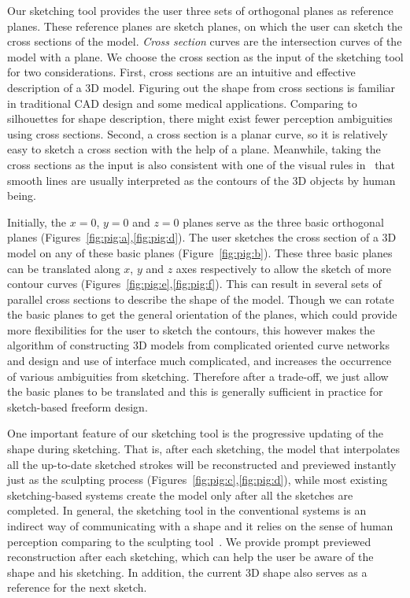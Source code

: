 Our sketching tool provides the user three sets of orthogonal planes
as reference planes. These reference planes are sketch planes, on
which the user can sketch the cross sections of the model.
\textit{Cross section} curves are the intersection curves of the
model with a plane. We choose the cross section as the input of the
sketching tool for two considerations. First, cross sections are an
intuitive and effective description of a 3D model. Figuring out the
shape from cross sections is familiar in traditional CAD design and
some medical applications. Comparing to silhouettes for shape
description, there might exist fewer perception ambiguities using
cross sections. Second, a cross section is a planar curve, so it is
relatively easy to sketch a cross section with the help of a plane.
Meanwhile, taking the cross sections as the input is also consistent
with one of the visual rules in~\cite{HD00} that smooth lines are
usually interpreted as the contours of the 3D objects by human being.

Initially, the $x=0$, $y=0$ and $z=0$ planes serve as the three
basic orthogonal planes (Figures~\ref{fig:pig:a},\ref{fig:pig:d}).
The user sketches the cross section of a 3D model on any of these
basic planes (Figure~\ref{fig:pig:b}). These three basic planes can
be translated along $x$, $y$ and $z$ axes respectively to allow the
sketch of more contour curves
(Figures~\ref{fig:pig:e},\ref{fig:pig:f}). This can result in
several sets of parallel cross sections to describe the shape of the
model. Though we can rotate the basic planes to get the general
orientation of the planes, which could provide more flexibilities
for the user to sketch the contours, this however makes the
algorithm of constructing 3D models from complicated oriented curve
networks and design and use of interface much complicated, and
increases the occurrence of various ambiguities from sketching.
Therefore after a trade-off, we just allow the basic planes to be
translated and this is generally sufficient in practice for
sketch-based freeform design.

One important feature of our sketching tool is the progressive
updating of the shape during sketching. That is, after each
sketching, the model that interpolates all the up-to-date sketched
strokes will be reconstructed and previewed instantly just as the
sculpting process (Figures~\ref{fig:pig:c},\ref{fig:pig:d}), while
most existing sketching-based systems create the model only after
all the sketches are completed. In general, the sketching tool in
the conventional systems is an indirect way of communicating with a
shape and it relies on the sense of human perception comparing to
the sculpting tool~\cite{CIW08}. We provide prompt previewed
reconstruction after each sketching, which can help the user be
aware of the shape and his sketching. In addition, the current 3D
shape also serves as a reference for the next sketch.


